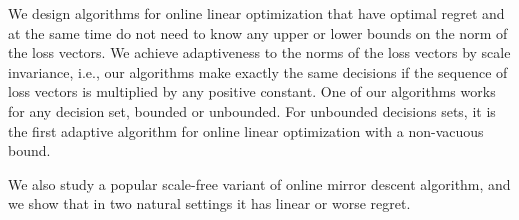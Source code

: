 We design algorithms for online linear optimization that have optimal regret
and at the same time do not need to know any upper or lower bounds on the norm
of the loss vectors.  We achieve adaptiveness to the norms of the loss vectors
by scale invariance, i.e., our algorithms make exactly the same decisions if
the sequence of loss vectors is multiplied by any positive constant.  One of
our algorithms works for any decision set, bounded or unbounded.  For unbounded
decisions sets, it is the first adaptive algorithm for online linear
optimization with a non-vacuous bound.

We also study a popular scale-free variant of online mirror descent algorithm,
and we show that in two natural settings it has linear or worse regret.
